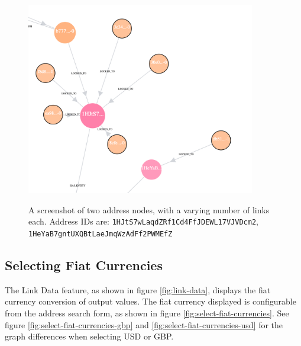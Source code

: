 \begin{figure}[h!]
  \centering
  \includegraphics[width = 10cm]{./figures/ui-screenshots/link-dependant-size-colour}\\[0.5cm] 
  \caption{A screenshot of two address nodes, with a varying number of links each.
  Address IDs are: \texttt{1HJtS7wLaqdZRf1Cd4FfJDEWL17VJVDcm2},\\\texttt{1HeYaB7gntUXQBtLaeJmqWzAdFf2PWMEfZ}}
  \label{fig:address-nodes-colour-size-change}
\end{figure}

\subsection{Selecting Fiat Currencies}
The Link Data feature, as shown in figure \ref{fig:link-data}, displays the fiat currency conversion of output values. The fiat currency displayed is configurable from the address search form, as shown in figure \ref{fig:select-fiat-currencies}. See figure \ref{fig:select-fiat-currencies-gbp} and \ref{fig:select-fiat-currencies-usd} for the graph differences when selecting USD or GBP. 

